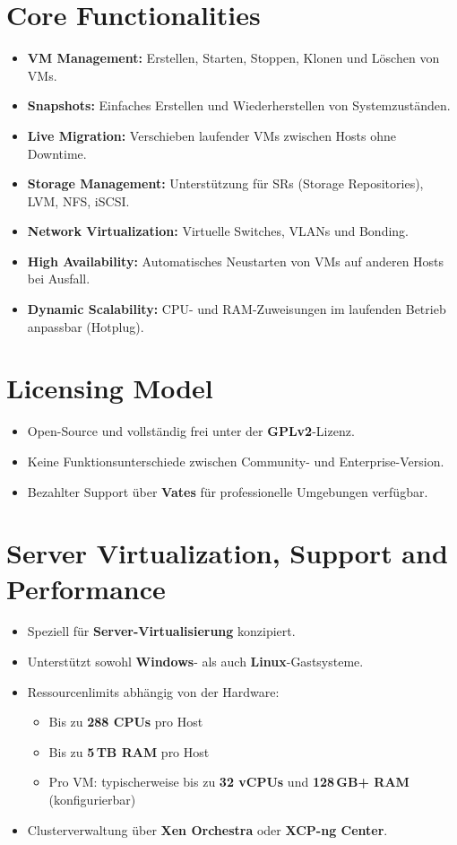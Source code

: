 \documentclass[BMR,Seminar,ngerman,IEEE]{twbook}
\begin{document}
\section{Core Functionalities}
\begin{itemize}[noitemsep]
  \item \textbf{VM Management:} Erstellen, Starten, Stoppen, Klonen und Löschen von VMs.
  \item \textbf{Snapshots:} Einfaches Erstellen und Wiederherstellen von Systemzuständen.
  \item \textbf{Live Migration:} Verschieben laufender VMs zwischen Hosts ohne Downtime.
  \item \textbf{Storage Management:} Unterstützung für SRs (Storage Repositories), LVM, NFS, iSCSI.
  \item \textbf{Network Virtualization:} Virtuelle Switches, VLANs und Bonding.
  \item \textbf{High Availability:} Automatisches Neustarten von VMs auf anderen Hosts bei Ausfall.
  \item \textbf{Dynamic Scalability:} CPU- und RAM-Zuweisungen im laufenden Betrieb anpassbar (Hotplug).
\end{itemize}

\section{Licensing Model}
\begin{itemize}[noitemsep]
  \item Open-Source und vollständig frei unter der \textbf{GPLv2}-Lizenz.
  \item Keine Funktionsunterschiede zwischen Community- und Enterprise-Version.
  \item Bezahlter Support über \textbf{Vates} für professionelle Umgebungen verfügbar.
\end{itemize}

\section{Server Virtualization, Support and Performance}
\begin{itemize}[noitemsep]
  \item Speziell für \textbf{Server-Virtualisierung} konzipiert.
  \item Unterstützt sowohl \textbf{Windows}- als auch \textbf{Linux}-Gastsysteme.
  \item Ressourcenlimits abhängig von der Hardware:
  \begin{itemize}
    \item Bis zu \textbf{288 CPUs} pro Host
    \item Bis zu \textbf{5\,TB RAM} pro Host
    \item Pro VM: typischerweise bis zu \textbf{32 vCPUs} und \textbf{128\,GB+ RAM} (konfigurierbar)
  \end{itemize}
  \item Clusterverwaltung über \textbf{Xen Orchestra} oder \textbf{XCP-ng Center}.
\end{itemize}
\end{document}
